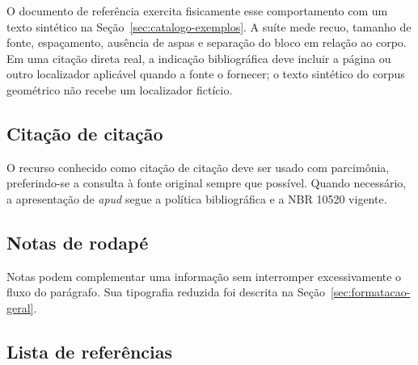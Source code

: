 O documento de referência exercita fisicamente esse comportamento com um texto sintético na Seção~\ref{sec:catalogo-exemplos}. A suíte mede recuo, tamanho de fonte, espaçamento, ausência de aspas e separação do bloco em relação ao corpo. Em uma citação direta real, a indicação bibliográfica deve incluir a página ou outro localizador aplicável quando a fonte o fornecer; o texto sintético do corpus geométrico não recebe um localizador fictício.

\subsection{Citação de citação}

O recurso conhecido como citação de citação deve ser usado com parcimônia, preferindo-se a consulta à fonte original sempre que possível. Quando necessário, a apresentação de \textit{apud} segue a política bibliográfica e a NBR 10520 vigente.


\subsection{Notas de rodapé}

Notas podem complementar uma informação sem interromper excessivamente o fluxo do parágrafo. Sua tipografia reduzida foi descrita na Seção~\ref{sec:formatacao-geral}.


\subsection{Lista de referências}


